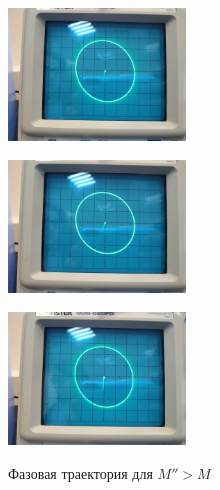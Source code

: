 \begin{center}
    \begin{figure}[H]
        \begin{minipage}{0.32\linewidth}
            \centering
            \includegraphics[height=100pt]{img/23.jpg} 
            \vspace{0pt}
            \label{fig:10}
        \end{minipage}
        \begin{minipage}{0.32\linewidth}
            \centering
            \includegraphics[height=100pt]{img/22.jpg} 
            \vspace{0pt}
            \label{fig:11}
        \end{minipage}
        \begin{minipage}{0.32\linewidth}
            \centering
            \includegraphics[height=100pt]{img/7.jpg} 
            \vspace{0pt}
            \label{fig:12}
        \end{minipage}
    \caption{Фазовая траектория для $M''> M $}
    \vspace{-40pt}
    \end{figure}
\end{center} 

